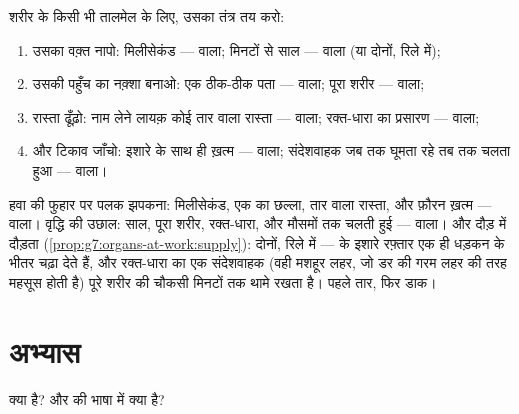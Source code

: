 \begin{method}[किसी संवाद की तंत्र-दर-तंत्र पहचान]\label{met:g8:nervous-communication:diagnose}
शरीर के किसी भी तालमेल के लिए, उसका तंत्र तय करो:
\begin{enumerate}
  \item उसका वक़्त नापो: मिलीसेकंड ---  वाला; मिनटों से साल
        ---  वाला (या दोनों, रिले में);
  \item उसकी पहुँच का नक़्शा बनाओ: एक ठीक-ठीक पता ---  वाला;
        पूरा शरीर ---  वाला;
  \item रास्ता ढूँढ़ो: नाम लेने लायक़ कोई तार वाला रास्ता --- 
        वाला; रक्त-धारा का प्रसारण ---  वाला;
  \item और टिकाव जाँचो: इशारे के साथ ही ख़त्म ---  वाला;
        संदेशवाहक जब तक घूमता रहे तब तक चलता हुआ ---  वाला।
\end{enumerate}
\end{method}

\begin{example}[तीन मामलों पर यह तरीक़ा]\label{ex:g8:nervous-communication:cases}
हवा की फुहार पर पलक झपकना: मिलीसेकंड, एक  का छल्ला, तार वाला रास्ता,
और फ़ौरन ख़त्म ---  वाला। वृद्धि की उछाल: साल, पूरा शरीर,
रक्त-धारा, और मौसमों तक चलती हुई ---  वाला। और दौड़ में दौड़ता
 (\cref{prop:g7:organs-at-work:supply}): दोनों, रिले में ---
 के इशारे रफ़्तार एक ही धड़कन के भीतर चढ़ा देते हैं, और
रक्त-धारा का एक संदेशवाहक (वही मशहूर लहर, जो डर की गरम लहर की तरह महसूस
होती है) पूरे शरीर की चौकसी मिनटों तक थामे रखता है। पहले तार, फिर डाक।
\end{example}

\section{अभ्यास}

\begin{exercise}[$\star$]\label{exo:g8:nervous-communication:1}
 क्या है? और  की भाषा में  क्या है?
\end{exercise}

